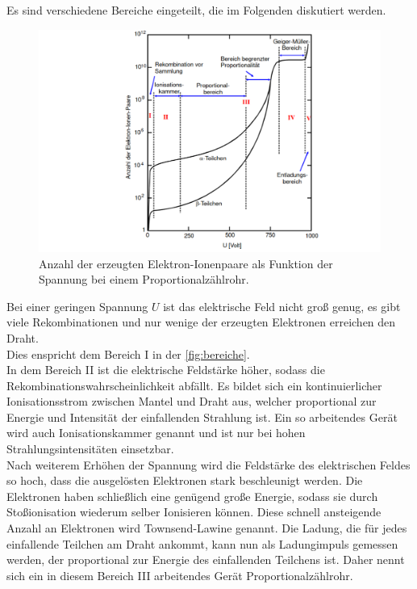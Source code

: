 Es sind verschiedene Bereiche eingeteilt, die im Folgenden diskutiert werden.
\begin{figure}
    \centering
    \includegraphics[width=\textwidth]{content/bereiche.pdf}
    \caption{Anzahl der erzeugten Elektron-Ionenpaare als Funktion der Spannung bei einem Proportionalzählrohr. \cite{anleitung}}
    \label{fig:bereiche}
\end{figure}
Bei einer geringen Spannung $U$ ist das elektrische Feld nicht groß genug, es gibt viele Rekombinationen und nur wenige der erzeugten Elektronen erreichen den Draht.\\
Dies enspricht dem Bereich I in der \autoref{fig:bereiche}.\\
In dem Bereich II ist die elektrische Feldstärke höher, sodass die Rekombinationswahrscheinlichkeit abfällt. 
Es bildet sich ein kontinuierlicher Ionisationsstrom zwischen Mantel und Draht aus, welcher proportional zur Energie und Intensität der einfallenden Strahlung ist. 
Ein so arbeitendes Gerät wird auch Ionisationskammer genannt und ist nur bei hohen Strahlungsintensitäten einsetzbar.\\
Nach weiterem Erhöhen der Spannung wird die Feldstärke des elektrischen Feldes so hoch, dass die ausgelösten Elektronen stark beschleunigt werden. 
Die Elektronen haben schließlich eine genügend große Energie, sodass sie durch Stoßionisation wiederum selber Ionisieren können.
Diese schnell ansteigende Anzahl an Elektronen wird Townsend-Lawine genannt. 
Die Ladung, die für jedes einfallende Teilchen am Draht ankommt, kann nun als Ladungimpuls gemessen werden, der proportional zur Energie des einfallenden Teilchens ist.
Daher nennt sich ein in diesem Bereich III arbeitendes Gerät Proportionalzählrohr.\\
